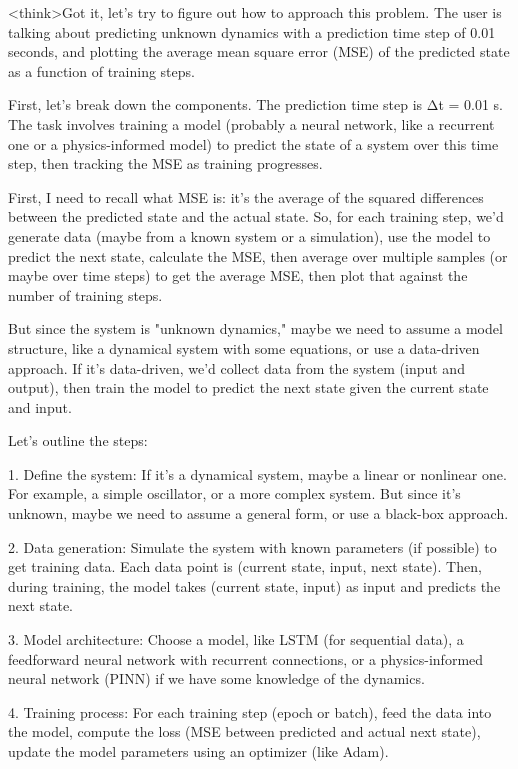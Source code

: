 <think>Got it, let's try to figure out how to approach this problem. The user is talking about predicting unknown dynamics with a prediction time step of 0.01 seconds, and plotting the average mean square error (MSE) of the predicted state as a function of training steps. 

First, let's break down the components. The prediction time step is Δt = 0.01 s. The task involves training a model (probably a neural network, like a recurrent one or a physics-informed model) to predict the state of a system over this time step, then tracking the MSE as training progresses. 

First, I need to recall what MSE is: it's the average of the squared differences between the predicted state and the actual state. So, for each training step, we'd generate data (maybe from a known system or a simulation), use the model to predict the next state, calculate the MSE, then average over multiple samples (or maybe over time steps) to get the average MSE, then plot that against the number of training steps.

But since the system is "unknown dynamics," maybe we need to assume a model structure, like a dynamical system with some equations, or use a data-driven approach. If it's data-driven, we'd collect data from the system (input and output), then train the model to predict the next state given the current state and input. 

Let's outline the steps:

1. Define the system: If it's a dynamical system, maybe a linear or nonlinear one. For example, a simple oscillator, or a more complex system. But since it's unknown, maybe we need to assume a general form, or use a black-box approach.

2. Data generation: Simulate the system with known parameters (if possible) to get training data. Each data point is (current state, input, next state). Then, during training, the model takes (current state, input) as input and predicts the next state.

3. Model architecture: Choose a model, like LSTM (for sequential data), a feedforward neural network with recurrent connections, or a physics-informed neural network (PINN) if we have some knowledge of the dynamics.

4. Training process: For each training step (epoch or batch), feed the data into the model, compute the loss (MSE between predicted and actual next state), update the model parameters using an optimizer (like Adam).

